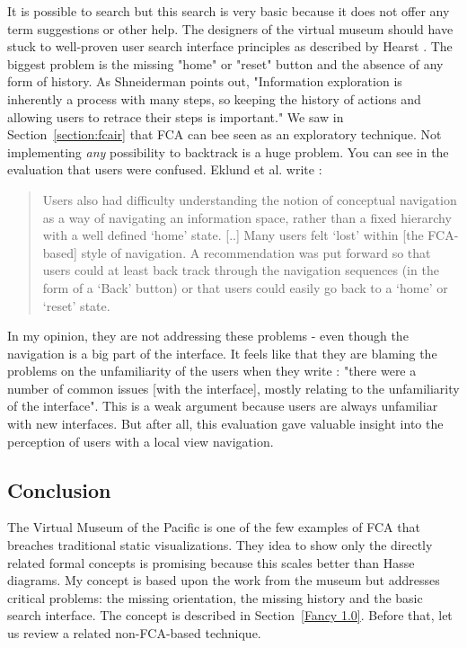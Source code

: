 \documentclass[11pt]{report}
\begin{document}
It is possible to search but this search is very basic because it does not offer any term suggestions or other help. The designers of the virtual museum should have stuck to well-proven user search interface principles as described by Hearst \cite{Hearst2009}. The biggest problem is the missing "home" or "reset" button and the absence of any form of history. As Shneiderman \cite{Shneiderman1996} points out, "Information exploration is inherently a process with many steps, so keeping the history of actions and allowing users to retrace their steps is important." We saw in Section~\ref{section:fcair} that FCA can bee seen as an exploratory technique. Not implementing \textit{any} possibility to backtrack is a huge problem. You can see in the evaluation that users were confused. Eklund et al. write \cite{Eklund2012}:
 \begin{quote}
 Users also had difficulty understanding the notion of conceptual navigation as a way of navigating an information space, rather than a fixed hierarchy with a well defined `home' state. [..] Many users felt `lost' within [the FCA-based] style of navigation. A recommendation was put forward so that users could at least back track through the navigation sequences (in the form of a `Back' button) or that users could easily go back to a `home' or `reset' state.
 \end{quote}
  In my opinion, they are not addressing these problems - even though the navigation is a big part of the interface. It feels like that they are blaming the problems on the unfamiliarity of the users when they write \cite{Eklund2012}: "there were a number of common issues [with the interface], mostly relating to the unfamiliarity of the interface". This is a weak argument because users are always unfamiliar with new interfaces. But after all, this evaluation gave valuable insight into the perception of users with a local view navigation.
  
\subsection{Conclusion}

The Virtual Museum of the Pacific is one of the few examples of FCA that breaches traditional static visualizations. They idea to show only the directly related formal concepts is promising because this scales better than Hasse diagrams. My concept is based upon the work from the museum but addresses critical problems: the missing orientation, the missing history and the basic search interface. The concept is described in Section~\ref{Fancy 1.0}. Before that, let us review a related non-FCA-based technique.\\
\end{document}
